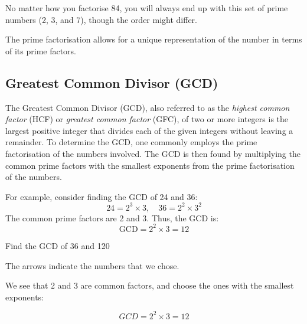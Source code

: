 No matter how you factorise 84, you will always end up with this set of prime numbers (2, 3, and 7), though the order might differ.

The prime factorisation allows for a unique representation of the number in terms of its prime factors.

\subsection*{Greatest Common Divisor (GCD)}
The Greatest Common Divisor (GCD), also referred to as the \textit{highest common factor} (HCF) or \textit{greatest common factor} (GFC), of two or more integers is the largest positive integer that divides each of the given integers without leaving a remainder. To determine the GCD, one commonly employs the prime factorisation of the numbers involved. The GCD is then found by multiplying the common prime factors with the smallest exponents from the prime factorisation of the numbers.

For example, consider finding the GCD of 24 and 36:
\[
24 = 2^3 \times 3, \quad 36 = 2^2 \times 3^2
\]
The common prime factors are 2 and 3. Thus, the GCD is:
\[
\text{GCD} = 2^2 \times 3 = 12
\]

\begin{example} Find the GCD of 36 and 120

\begin{solution}
    

The arrows indicate the numbers that we chose.


We see that 2 and 3 are common factors, and choose the ones with the smallest exponents:

\[
GCD = 2^2\times 3 = 12
\]
\end{solution}

\end{example}
 
